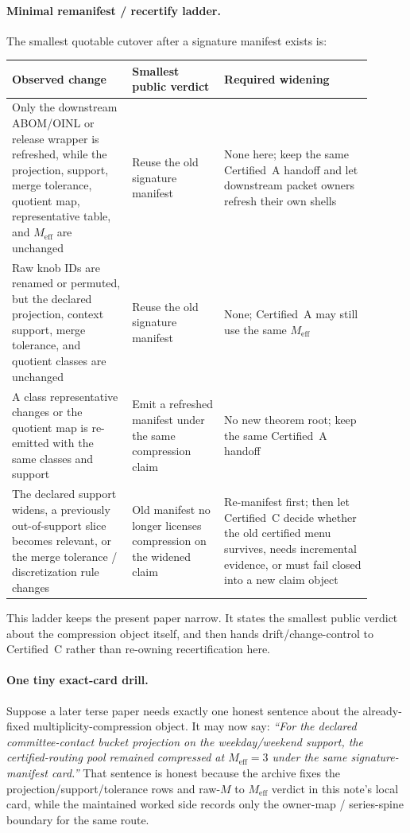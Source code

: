 \documentclass[11pt]{article}
\begin{document}
\paragraph{Minimal remanifest / recertify ladder.}
The smallest quotable cutover after a signature manifest exists is:
\begin{center}\small
\begin{tabular}{@{}p{0.30\linewidth}p{0.23\linewidth}p{0.37\linewidth}@{}}
\toprule
Observed change & Smallest public verdict & Required widening \\
\midrule
Only the downstream ABOM/OINL or release wrapper is refreshed, while the projection, support, merge tolerance, quotient map, representative table, and $M_{\mathrm{eff}}$ are unchanged & Reuse the old signature manifest & None here; keep the same Certified~A handoff and let downstream packet owners refresh their own shells \\
Raw knob IDs are renamed or permuted, but the declared projection, context support, merge tolerance, and quotient classes are unchanged & Reuse the old signature manifest & None; Certified~A may still use the same $M_{\mathrm{eff}}$ \\
A class representative changes or the quotient map is re-emitted with the same classes and support & Emit a refreshed manifest under the same compression claim & No new theorem root; keep the same Certified~A handoff \\
The declared support widens, a previously out-of-support slice becomes relevant, or the merge tolerance / discretization rule changes & Old manifest no longer licenses compression on the widened claim & Re-manifest first; then let Certified~C decide whether the old certified menu survives, needs incremental evidence, or must fail closed into a new claim object \\
\bottomrule
\end{tabular}
\end{center}
This ladder keeps the present paper narrow.
It states the smallest public verdict about the compression object itself, and then hands drift/change-control to Certified~C rather than re-owning recertification here.\cite{series:recert}

\paragraph{One tiny exact-card drill.}
Suppose a later terse paper needs exactly one honest sentence about the already-fixed multiplicity-compression object. It may now say: \emph{``For the declared committee-contact bucket projection on the weekday/weekend support, the certified-routing pool remained compressed at $M_{\mathrm{eff}}=3$ under the same signature-manifest card.''}
That sentence is honest because the archive fixes the projection/support/tolerance rows and raw-$M$ to $M_{\mathrm{eff}}$ verdict in this note's local card, while the maintained worked side records only the owner-map / series-spine boundary for the same route.\cite{series:workedexample,series:seriesspines}
\end{document}
